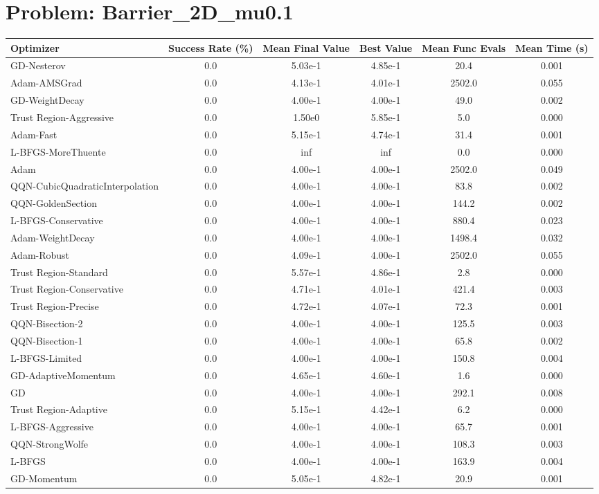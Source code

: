 \documentclass{article}
\begin{document}
\section{Problem: Barrier\_2D\_mu0.1}
\begin{longtable}{p{3cm}*{5}{c}}
\toprule
\textbf{Optimizer} & \textbf{Success Rate (\%)} & \textbf{Mean Final Value} & \textbf{Best Value} & \textbf{Mean Func Evals} & \textbf{Mean Time (s)} \\
\midrule
GD-Nesterov & 0.0 & 5.03e-1 & 4.85e-1 & 20.4 & 0.001 \\
Adam-AMSGrad & 0.0 & 4.13e-1 & 4.01e-1 & 2502.0 & 0.055 \\
GD-WeightDecay & 0.0 & 4.00e-1 & 4.00e-1 & 49.0 & 0.002 \\
Trust Region-Aggressive & 0.0 & 1.50e0 & 5.85e-1 & 5.0 & 0.000 \\
Adam-Fast & 0.0 & 5.15e-1 & 4.74e-1 & 31.4 & 0.001 \\
L-BFGS-MoreThuente & 0.0 & inf & inf & 0.0 & 0.000 \\
Adam & 0.0 & 4.00e-1 & 4.00e-1 & 2502.0 & 0.049 \\
QQN-CubicQuadraticInterpolation & 0.0 & 4.00e-1 & 4.00e-1 & 83.8 & 0.002 \\
QQN-GoldenSection & 0.0 & 4.00e-1 & 4.00e-1 & 144.2 & 0.002 \\
L-BFGS-Conservative & 0.0 & 4.00e-1 & 4.00e-1 & 880.4 & 0.023 \\
Adam-WeightDecay & 0.0 & 4.00e-1 & 4.00e-1 & 1498.4 & 0.032 \\
Adam-Robust & 0.0 & 4.09e-1 & 4.00e-1 & 2502.0 & 0.055 \\
Trust Region-Standard & 0.0 & 5.57e-1 & 4.86e-1 & 2.8 & 0.000 \\
Trust Region-Conservative & 0.0 & 4.71e-1 & 4.01e-1 & 421.4 & 0.003 \\
Trust Region-Precise & 0.0 & 4.72e-1 & 4.07e-1 & 72.3 & 0.001 \\
QQN-Bisection-2 & 0.0 & 4.00e-1 & 4.00e-1 & 125.5 & 0.003 \\
QQN-Bisection-1 & 0.0 & 4.00e-1 & 4.00e-1 & 65.8 & 0.002 \\
L-BFGS-Limited & 0.0 & 4.00e-1 & 4.00e-1 & 150.8 & 0.004 \\
GD-AdaptiveMomentum & 0.0 & 4.65e-1 & 4.60e-1 & 1.6 & 0.000 \\
GD & 0.0 & 4.00e-1 & 4.00e-1 & 292.1 & 0.008 \\
Trust Region-Adaptive & 0.0 & 5.15e-1 & 4.42e-1 & 6.2 & 0.000 \\
L-BFGS-Aggressive & 0.0 & 4.00e-1 & 4.00e-1 & 65.7 & 0.001 \\
QQN-StrongWolfe & 0.0 & 4.00e-1 & 4.00e-1 & 108.3 & 0.003 \\
L-BFGS & 0.0 & 4.00e-1 & 4.00e-1 & 163.9 & 0.004 \\
GD-Momentum & 0.0 & 5.05e-1 & 4.82e-1 & 20.9 & 0.001 \\
\bottomrule
\end{longtable}
\end{document}
